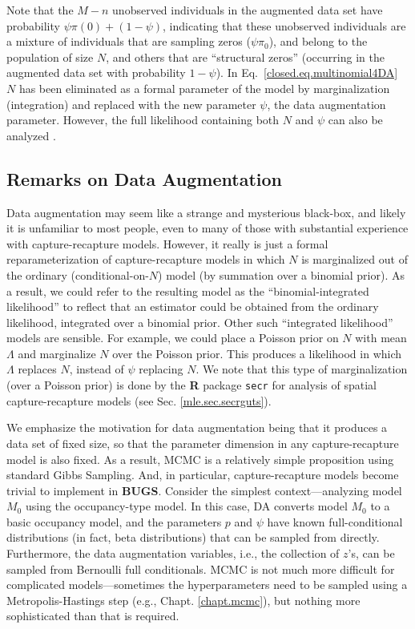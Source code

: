 Note that the $M-n$ unobserved individuals in the augmented data set
have probability $\psi \pi(0) + (1-\psi)$, indicating that these
unobserved individuals are a mixture of individuals that are sampling
zeros ($\psi \pi_0$), and belong to the population of size $N$, and
others that are ``structural zeros'' (occurring in the augmented data
set with probability $1 - \psi$). In Eq.~\ref{closed.eq.multinomial4DA} $N$
has been eliminated as a formal parameter of the model by
marginalization (integration) and replaced with the new parameter
$\psi$, the data augmentation parameter.
However, the full likelihood containing both $N$ and $\psi$ can also be
analyzed \citep[see][]{royle_etal:2007}.


\subsection{Remarks on Data Augmentation}
\label{closed.sec.remarks}

Data augmentation may seem like a strange and mysterious black-box,
and likely it is unfamiliar to most people, even to many of those with substantial
experience with capture-recapture models. However, it really is just a
formal reparameterization of capture-recapture models in which $N$ is
marginalized out of the ordinary (conditional-on-$N$) model (by
summation over a binomial prior).
As a result, we could refer to the resulting model as the
``binomial-integrated likelihood'' to reflect that an estimator could
be obtained from the ordinary likelihood, integrated over a binomial
prior. Other such ``integrated likelihood'' models are sensible. For
example, we could place a Poisson prior on $N$ with mean $\Lambda$ and
marginalize $N$ over the Poisson prior. This produces a likelihood in
which $\Lambda$ replaces $N$, instead of $\psi$ replacing $N$.  We
note that this type of marginalization (over a Poisson prior) is done by
the {\bf R} package \mbox{\tt secr} for analysis of spatial
capture-recapture models (see Sec. \ref{mle.sec.secrguts}).


We emphasize the motivation for data augmentation being that it
produces a data set of fixed size, so that the parameter dimension in
any capture-recapture model is also fixed.  As a result, MCMC is a
relatively simple proposition using standard Gibbs Sampling.  And, in
particular, capture-recapture models become trivial to implement in
{\bf BUGS}. Consider the simplest context---analyzing model $M_0$
using the occupancy-type model. In this case, DA converts model $M_0$
to a basic occupancy model, and the parameters $p$ and $\psi$ have
known full-conditional distributions (in fact, beta distributions)
that can be sampled from directly.  Furthermore, the data augmentation
variables, i.e., the collection of $z$'s, can be sampled from
Bernoulli full conditionals. MCMC is not much more difficult for
complicated models---sometimes the hyperparameters need to be sampled
using a Metropolis-Hastings step (e.g., Chapt. \ref{chapt.mcmc}), but
nothing more sophisticated than that is required.

